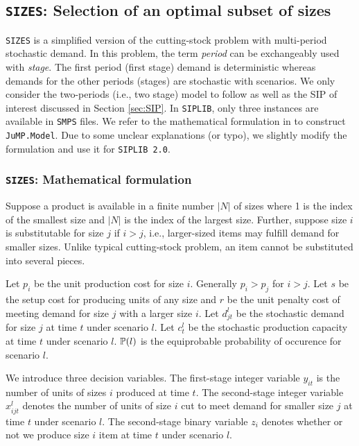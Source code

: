 \subsection{\texttt{SIZES}: Selection of an optimal subset of sizes}
\texttt{SIZES} is a simplified version of the cutting-stock problem with multi-period stochastic demand. In this problem, the term \textit{period} can be exchangeably used with \textit{stage}. The first period (first stage) demand is deterministic whereas demands for the other periods (stages) are stochastic with scenarios. We only consider the two-periods (i.e., two stage) model to follow \cite{journal:JSW1999} as well as the SIP of interest discussed in Section \ref{sec:SIP}. In \texttt{SIPLIB}, only three instances are available in \texttt{SMPS} files. We refer to the mathematical formulation in \cite{journal:JSW1999} to construct \texttt{JuMP.Model}. Due to some unclear explanations (or typo), we slightly modify the formulation and use it for \texttt{SIPLIB 2.0}.

\subsubsection{\texttt{SIZES}: Mathematical formulation}
Suppose a product is available in a finite number $|N|$ of sizes where 1 is the index of the smallest size and $|N|$ is the index of the largest size. Further, suppose size $i$ is substitutable for size $j$ if $i>j$, i.e., larger-sized items may fulfill demand for smaller sizes. Unlike typical cutting-stock problem, an item cannot be substituted into several pieces. 

Let $p_i$ be the unit production cost for size $i$. Generally $p_i>p_j$ for $i>j$. Let $s$ be the setup cost for producing units of any size and $r$ be the unit penalty cost of meeting demand for size $j$ with a larger size $i$. Let $d_{jt}^l$ be the stochastic demand for size $j$ at time $t$ under scenario $l$. Let $c_t^l$ be the stochastic production capacity at time $t$ under scenario $l$. $\operatorname*{\mathbb{P}}(l)$ is the equiprobable probability of occurence for scenario $l$.

We introduce three decision variables. The first-stage integer variable $y_{it}$ is the number of units of sizes $i$ produced at time $t$. The second-stage integer variable $x_{ijt}^l$ denotes the number of units of size $i$ cut to meet demand for smaller size $j$ at time $t$ under scenario $l$. The second-stage binary variable $z_i$ denotes whether or not we produce size $i$ item at time $t$ under scenario $l$. 

